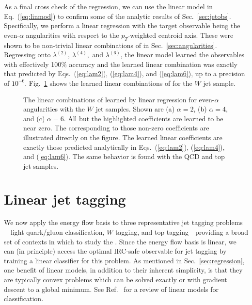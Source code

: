 \documentclass[letterpaper,11pt]{article}
\DeclareRobustCommand{\Sec}[1]{Sec.~\ref{#1}}
\DeclareRobustCommand{\Fig}[1]{Fig.~\ref{#1}}
\DeclareRobustCommand{\Eq}[1]{Eq.~(\ref{#1})}
\DeclareRobustCommand{\Eqss}[3]{Eqs.~(\ref{#1}), (\ref{#2}), and (\ref{#3})}
\DeclareRobustCommand{\Ref}[1]{Ref.~\cite{#1}}
\newcommand{\B}{\text{EFP}\xspace}
\newcommand{\Bs}{\text{EFPs}\xspace}
\begin{document}
As a final cross check of the regression, we can use the linear model in \Eq{eq:linmod} to confirm some of the analytic results of \Sec{sec:jetobs}.
%
Specifically, we perform a linear regression with the target observable being the even-$\alpha$ angularities with respect to the $p_T$-weighted centroid axis.
%
These were shown to be non-trivial linear combinations of \Bs in \Sec{sec:angularities}.
%
Regressing onto $\lambda^{(2)},\,\lambda^{(4)},$ and $\lambda^{(6)}$, the linear model learned the observables with effectively 100\% accuracy and the learned linear combination was exactly that predicted by \Eqss{eq:lam2}{eq:lam4}{eq:lam6}, up to a precision of $10^{-6}$.
%
\Fig{fig:linspec} shows the learned linear combinations of \Bs for the $W$ jet sample.

\begin{figure}[t]
\centering
{}
\caption{The linear combinations of \Bs learned by linear regression for even-$\alpha$ angularities with the $W$ jet samples.   Shown are (a) $\alpha = 2$, (b) $\alpha = 4$, and (c) $\alpha = 6$.  All but the highlighted \B coefficients are learned to be near zero. The \Bs corresponding to those non-zero coefficients are illustrated directly on the figure. The learned linear coefficients are exactly those predicted analytically in \Eqss{eq:lam2}{eq:lam4}{eq:lam6}. The same behavior is found with the QCD and top jet samples.}
\label{fig:linspec}
\end{figure}


\section{Linear jet tagging}
\label{sec:linclass}

We now apply the energy flow basis to three representative jet tagging problems---light-quark/gluon classification, $W$ tagging, and top tagging---providing a broad set of contexts in which to study the \Bs.
%
Since the energy flow basis is linear, we can (in principle) access the optimal IRC-safe observable for jet tagging by training a linear classifier for this problem.
%
As mentioned in \Sec{sec:regression}, one benefit of linear models, in addition to their inherent simplicity, is that they are typically convex problems which can be solved exactly or with gradient descent to a global minimum.
%
See \Ref{bishop2006pattern} for a review of linear models for classification.
\end{document}
